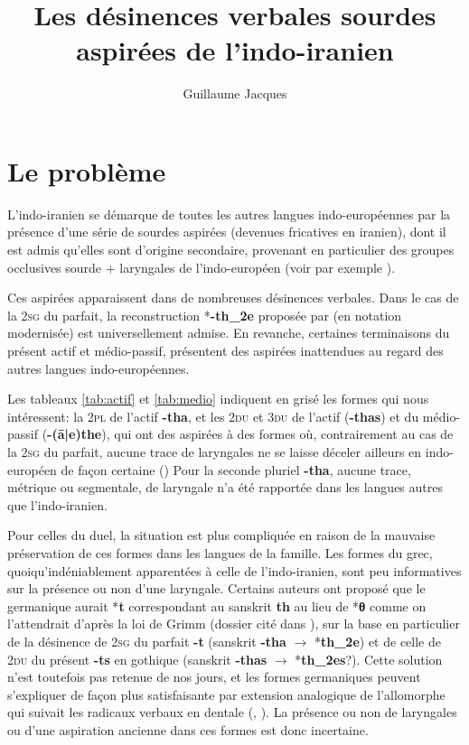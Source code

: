 \documentclass[oneside,a4paper,11pt]{article}
\newcommand{\ipa}[1]{{\phon\mbox{\textbf{#1}}}}
\begin{document}
 
\title{Les désinences verbales sourdes aspirées de l'indo-iranien}
\author{Guillaume Jacques}
\maketitle
 
\sloppy
\section{Le problème}

L'indo-iranien se démarque de toutes les autres langues indo-européennes par la présence d'une série de sourdes aspirées (devenues fricatives en iranien), dont il est admis qu'elles sont d'origine secondaire, provenant en particulier des groupes occlusives sourde + laryngales de l'indo-européen (voir par exemple \citet[112-4]{mayrhofer05fortsetzung}).

Ces aspirées apparaissent dans de nombreuses désinences verbales. Dans le cas de la \textsc{2sg} du parfait, la reconstruction *\ipa{-th_2e} proposée par \citet{kurylowicz1927schwa} (en notation modernisée) est universellement admise. En revanche, certaines terminaisons du présent actif et médio-passif, présentent des aspirées inattendues au regard des autres langues indo-européennes.

Les tableaux \ref{tab:actif} et \ref{tab:medio} indiquent en grisé les formes qui nous intéressent: la \textsc{2pl} de l'actif \ipa{-tha}, et les \textsc{2du} et \textsc{3du} de l'actif (\ipa{-thas}) et du médio-passif  (\ipa{-(ā|e)the}), qui ont des aspirées à des formes où, contrairement au cas de la \textsc{2sg} du parfait, aucune trace de laryngales ne se laisse déceler ailleurs en indo-européen de façon certaine (\citealt[309-311]{burrow55skt})
Pour la seconde pluriel \ipa{-tha}, aucune trace, métrique ou segmentale, de laryngale n'a été rapportée dans les langues autres que l'indo-iranien. 

Pour celles du duel, la situation est plus compliquée en raison de la mauvaise préservation de ces formes dans les langues de la famille. Les formes du grec, quoiqu'indéniablement apparentées à celle de l'indo-iranien, sont peu informatives sur la présence ou non d'une laryngale. Certains auteurs ont proposé que le germanique aurait *\ipa{t} correspondant au sanskrit \ipa{th} au lieu de *\ipa{θ} comme on l'attendrait d'après la loi de Grimm (dossier cité dans \citealt[113]{mayrhofer05fortsetzung}), sur la base en particulier de la désinence de \textsc{2sg} du parfait \ipa{-t} (sanskrit \ipa{-tha} $\rightarrow$ *\ipa{th_2e}) et de celle de \textsc{2du} du présent  \ipa{-ts} en gothique (sanskrit \ipa{-thas} $\rightarrow$ *\ipa{th_2es}?). Cette solution n'est toutefois pas retenue de nos jours, et les formes germaniques peuvent s'expliquer de façon plus satisfaisante par extension analogique de l'allomorphe qui suivait les radicaux verbaux en dentale (\citealt[84]{hill03zusammenstoss}, \citealt[192]{ringe06PIE}). La présence ou non de laryngales ou d'une aspiration ancienne dans ces formes est donc incertaine.
\end{document}
